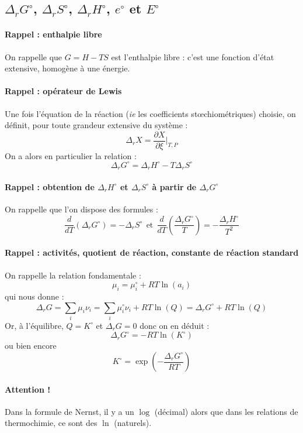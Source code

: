 \documentclass[french]{book}
\theoremstyle{plain}
\theoremstyle{definition}
\theoremstyle{remark}
\begin{document}
\subsection{$\Delta_r G^\circ$, $\Delta_rS^\circ$, $\Delta_rH^\circ$, $e^\circ$ et $E^\circ$}

\paragraph{Rappel : enthalpie libre} On rappelle que $G=H-TS$ est l'enthalpie libre : c'est une fonction d'état extensive, homogène à une énergie.

\paragraph{Rappel : opérateur de Lewis} Une fois l'équation de la réaction (\textit{ie} les coefficients stœchiométriques) choisie, on définit, pour toute grandeur extensive du système : $$\Delta_rX=\frac{\partial X}{\partial\xi}\bigg|_{T,P}$$ On a alors en particulier la relation : $$\Delta_rG^\circ=\Delta_rH^\circ-T\Delta_rS^\circ$$

\paragraph{Rappel : obtention de $\Delta_rH^\circ$ et $\Delta_rS^\circ$ à partir de $\Delta_rG^\circ$} On rappelle que l'on dispose des formules : $$\frac{d}{dT}\left(\Delta_rG^\circ\right)=-\Delta_rS^\circ\ \ \text{et}\ \  \frac{d}{dT}\left(\frac{\Delta_rG^\circ}{T}\right)=-\frac{\Delta_rH^\circ}{T^2}$$

\paragraph{Rappel : activités, quotient de réaction, constante de réaction standard} On rappelle la relation fondamentale : $$\mu_i=\mu_i^\circ+RT\ln(a_i)$$ qui nous donne : $$\Delta_rG=\sum_i\mu_i\nu_i=\sum_i\mu_i^\circ\nu_i+RT\ln(Q)=\Delta_rG^\circ+RT\ln(Q)$$ Or, à l'équilibre, $Q=K^\circ$ et $\Delta_rG=0$ donc on en déduit : $$\Delta_rG^\circ=-RT\ln(K^\circ)$$ ou bien encore $$K^\circ=\exp\left(-\frac{\Delta_rG^\circ}{RT}\right)$$

\paragraph{Attention !} Dans la formule de Nernst, il y a un $\log$ (décimal) alors que dans les relations de thermochimie, ce sont des $\ln$ (naturels).
\end{document}
